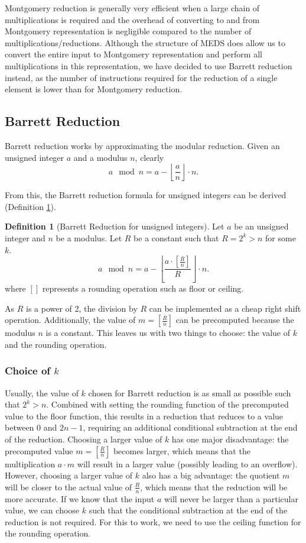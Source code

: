 \documentclass[11pt,a4paper]{report}
\theoremstyle{definition}
\newtheorem{definition}{Definition}[section]
\begin{document}
Montgomery reduction is generally very efficient when a large chain of multiplications is required and the overhead of converting to and from Montgomery representation is negligible compared to the number of multiplications/reductions. Although the structure of MEDS does allow us to convert the entire input to Montgomery representation and perform all multiplications in this representation, we have decided to use Barrett reduction instead, as the number of instructions required for the reduction of a single element is lower than for Montgomery reduction.

\subsection{Barrett Reduction}
\label{sec:barrettreduction}
Barrett reduction works by approximating the modular reduction. Given an unsigned integer $a$ and a modulus $n$, clearly
\[
  a \mod n = a - \left\lfloor \frac{a}{n} \right\rfloor \cdot n.
\]

From this, the Barrett reduction formula for unsigned integers can be derived (Definition \ref{def:barrettreduction}).

\begin{definition}[Barrett Reduction for unsigned integers]
  \label{def:barrettreduction}
  Let $a$ be an unsigned integer and $n$ be a modulus.
  Let $R$ be a constant such that $R = 2^k > n$ for some $k$.
  \[
    a \mod n = a - \left\lfloor \frac{a \cdot \left[\frac{R}{n}\right]}{R} \right\rfloor \cdot n.
  \]
  where $\left[\right]$ represents a rounding operation such as floor or ceiling.
\end{definition}

As $R$ is a power of 2, the division by $R$ can be implemented as a cheap right shift operation. Additionally, the value of $m = \left[\frac{R}{n}\right]$ can be precomputed because the modulus $n$ is a constant. This leaves us with two things to choose: the value of $k$ and the rounding operation.

\subsubsection{Choice of $k$}
Usually, the value of $k$ chosen for Barrett reduction is as small as possible such that $2^k > n$. Combined with setting the rounding function of the precomputed value to the floor function, this results in a reduction that reduces to a value between $0$ and $2n-1$, requiring an additional conditional subtraction at the end of the reduction. Choosing a larger value of $k$ has one major disadvantage: the precomputed value $m = \left[\frac{R}{n}\right]$ becomes larger, which means that the multiplication $a \cdot m$ will result in a larger value (possibly leading to an overflow). However, choosing a larger value of $k$ also has a big advantage: the quotient $m$ will be closer to the actual value of $\frac{R}{n}$, which means that the reduction will be more accurate. If we know that the input $a$ will never be larger than a particular value, we can choose $k$ such that the conditional subtraction at the end of the reduction is not required. For this to work, we need to use the ceiling function for the rounding operation.
\end{document}
